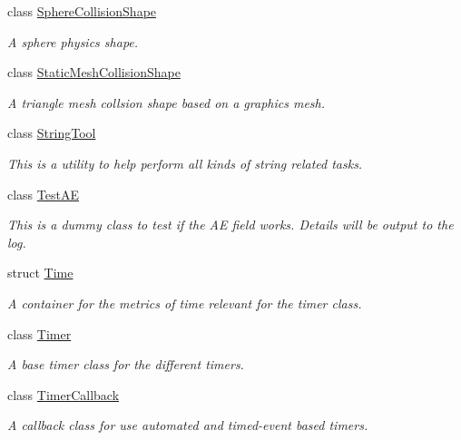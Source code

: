 \begin{DoxyCompactItemize}
class \hyperlink{classphys_1_1SphereCollisionShape}{SphereCollisionShape}
\begin{DoxyCompactList}\small\item\em A sphere physics shape. \item\end{DoxyCompactList}\item 
class \hyperlink{classphys_1_1StaticMeshCollisionShape}{StaticMeshCollisionShape}
\begin{DoxyCompactList}\small\item\em A triangle mesh collsion shape based on a graphics mesh. \item\end{DoxyCompactList}\item 
class \hyperlink{classphys_1_1StringTool}{StringTool}
\begin{DoxyCompactList}\small\item\em This is a utility to help perform all kinds of string related tasks. \item\end{DoxyCompactList}\item 
class \hyperlink{classphys_1_1TestAE}{TestAE}
\begin{DoxyCompactList}\small\item\em This is a dummy class to test if the AE field works. Details will be output to the log. \item\end{DoxyCompactList}\item 
struct \hyperlink{structphys_1_1Time}{Time}
\begin{DoxyCompactList}\small\item\em A container for the metrics of time relevant for the timer class. \item\end{DoxyCompactList}\item 
class \hyperlink{classphys_1_1Timer}{Timer}
\begin{DoxyCompactList}\small\item\em A base timer class for the different timers. \item\end{DoxyCompactList}\item 
class \hyperlink{classphys_1_1TimerCallback}{TimerCallback}
\begin{DoxyCompactList}\small\item\em A callback class for use automated and timed-\/event based timers. \item\end{DoxyCompactList}\item 

\end{DoxyCompactItemize}
